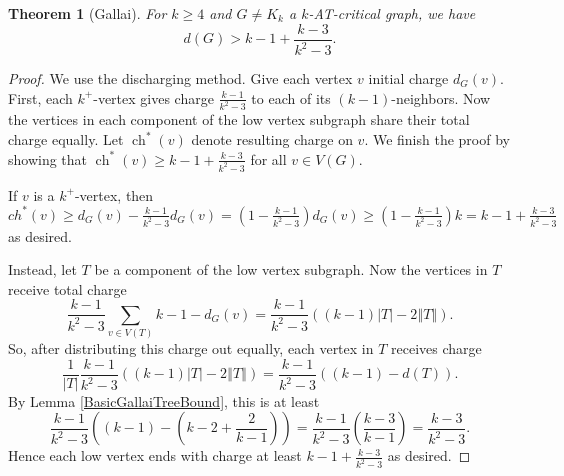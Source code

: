 \documentclass[12pt]{article}
\theoremstyle{plain}
\newtheorem{thm}{Theorem}[section]
\theoremstyle{definition}
\theoremstyle{remark}
\newcommand{\size}[1]{\left\Vert#1\right\Vert}
\newcommand{\parens}[1]{\left( #1 \right)}
\newcommand{\ch}{\operatorname{ch}}
\begin{document}
\begin{thm}[Gallai]
\label{thm:Gallai}
	For $k \ge 4$ and $G \ne K_k$ a $k$-AT-critical graph, we have
	\[d(G) > k-1 + \frac{k-3}{k^2-3}.\]
\end{thm}
\begin{proof}
    We use the discharging method. Give each vertex $v$ initial charge $d_G(v)$.  First, each $k^+$-vertex gives charge
    $\frac{k-1}{k^2-3}$ to each of its $(k-1)$-neighbors.  Now the vertices in each component of the low vertex subgraph share  
    their total charge equally.  Let $\ch^*(v)$ denote resulting charge on $v$.  We finish the proof by showing that $\ch^*(v) 
    \ge k-1 + \frac{k-3}{k^2-3}$ for all $v \in V(G)$.
	
	If $v$ is a $k^+$-vertex, then $ch^*(v) \ge d_G(v) - \frac{k-1}{k^2-3}d_G(v) = \parens{1- \frac{k-1}{k^2-3}}d_G(v) \ge \parens{1- \frac{k-1}{k^2-3}}k = k-1 + \frac{k-3}{k^2-3}$ as desired.

	Instead, let $T$ be a component of the low vertex subgraph.  Now the vertices in $T$ receive total charge
	\[\frac{k-1}{k^2-3}\sum_{v \in V(T)} k-1 - d_G(v) = \frac{k-1}{k^2-3}\parens{(k-1)|T| - 2\size{T}}.\]
	So, after distributing this charge out equally, each vertex in $T$ receives charge
	\[\frac{1}{|T|}\frac{k-1}{k^2-3}((k-1)|T| - 2\size{T}) = \frac{k-1}{k^2-3}\parens{(k-1) - d(T)}.\]
	By Lemma \ref{BasicGallaiTreeBound}, this is at least
	\[\frac{k-1}{k^2-3}\parens{(k-1) - \parens{k-2 + \frac{2}{k-1}}} = \frac{k-1}{k^2-3}\parens{\frac{k-3}{k-1}} = \frac{k-3}{k^2-3}.\]
	Hence each low vertex ends with charge at least $k-1 + \frac{k-3}{k^2-3}$ as desired.
\end{proof}
\end{document}
